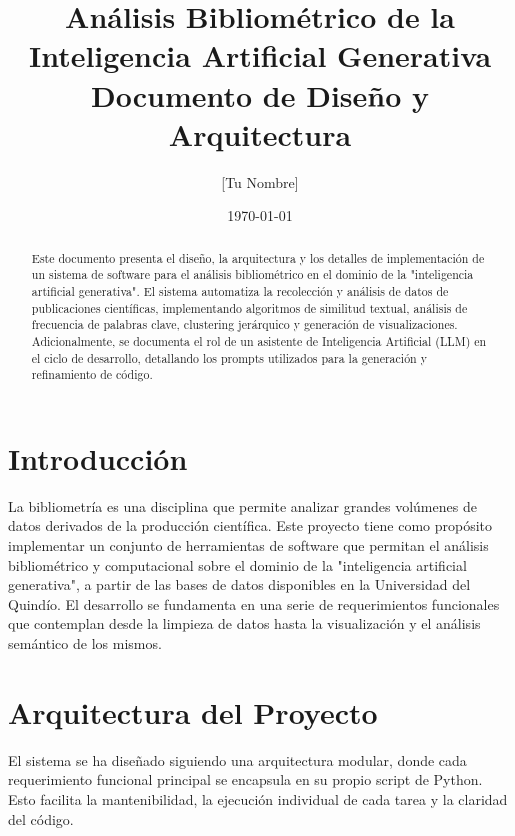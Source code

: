 \documentclass[12pt, a4paper]{article}
\title{Análisis Bibliométrico de la Inteligencia Artificial Generativa\large \vspace{0.5em} 
    \normalsize Documento de Diseño y Arquitectura}
\author{[Tu Nombre]}
\date{\today}
\begin{document}
\maketitle

\begin{abstract}
    Este documento presenta el diseño, la arquitectura y los detalles de implementación de un sistema de software para el análisis bibliométrico en el dominio de la "inteligencia artificial generativa". El sistema automatiza la recolección y análisis de datos de publicaciones científicas, implementando algoritmos de similitud textual, análisis de frecuencia de palabras clave, clustering jerárquico y generación de visualizaciones. Adicionalmente, se documenta el rol de un asistente de Inteligencia Artificial (LLM) en el ciclo de desarrollo, detallando los prompts utilizados para la generación y refinamiento de código.
\end{abstract}

\tableofcontents
\newpage

\section{Introducción}
La bibliometría es una disciplina que permite analizar grandes volúmenes de datos derivados de la producción científica. Este proyecto tiene como propósito implementar un conjunto de herramientas de software que permitan el análisis bibliométrico y computacional sobre el dominio de la "inteligencia artificial generativa", a partir de las bases de datos disponibles en la Universidad del Quindío. El desarrollo se fundamenta en una serie de requerimientos funcionales que contemplan desde la limpieza de datos hasta la visualización y el análisis semántico de los mismos.

\section{Arquitectura del Proyecto}
El sistema se ha diseñado siguiendo una arquitectura modular, donde cada requerimiento funcional principal se encapsula en su propio script de Python. Esto facilita la mantenibilidad, la ejecución individual de cada tarea y la claridad del código.
\end{document}
